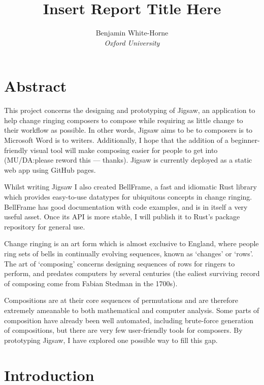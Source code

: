 \documentclass[12pt]{article}
\title{Insert Report Title Here}
\author{Benjamin White-Horne \\ \emph{Oxford University}}
\newcommand{\br}[0]{\vspace{10pt} \noindent}
\begin{document}
\maketitle



\pagebreak

\section*{Abstract}

This project concerns the designing and prototyping of Jigsaw, an application to help change ringing
composers to compose while requiring as little change to their workflow as possible.  In other
words, Jigsaw aims to be to composers is to Microsoft Word is to writers.  Additionally, I hope that
the addition of a beginner-friendly visual tool will make composing easier for people to get into
(MU/DA:\@ please reword this --- thanks).  Jigsaw is currently deployed as a static web app using
GitHub pages.

Whilst writing Jigsaw I also created BellFrame, a fast and idiomatic Rust library which provides
easy-to-use datatypes for ubiquitous concepts in change ringing.  BellFrame has good documentation
with code examples, and is in itself a very useful asset.  Once its API is more stable, I will
publish it to Rust's package repository for general use.

\br{}Change ringing is an art form which is almost exclusive to England, where people ring sets of
bells in continually evolving sequences, known as `changes' or `rows'.  The art of `composing'
concerns designing sequences of rows for ringers to perform, and predates computers by several
centuries (the ealiest surviving record of composing come from Fabian Stedman in the 1700s).

Compositions are at their core sequences of permutations and are therefore extremely ameanable to
both mathematical and computer analysis.  Some parts of composition have already been well
automated, including brute-force generation of compositions, but there are very few user-friendly
tools for composers.  By prototyping Jigsaw, I have explored one possible way to fill this gap.



\pagebreak

\tableofcontents



\pagebreak

\section{Introduction}
\end{document}
